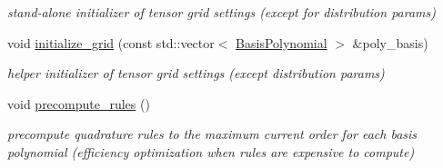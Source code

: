 \begin{DoxyCompactItemize}
\begin{DoxyCompactList}\small\item\em stand-\/alone initializer of tensor grid settings (except for distribution params) \end{DoxyCompactList}\item 
void \hyperlink{classPecos_1_1TensorProductDriver_a4a1a63a0f30824fcd233da026bdebef6}{initialize\+\_\+grid} (const std\+::vector$<$ \hyperlink{classPecos_1_1BasisPolynomial}{Basis\+Polynomial} $>$ \&poly\+\_\+basis)\label{classPecos_1_1TensorProductDriver_a4a1a63a0f30824fcd233da026bdebef6}

\begin{DoxyCompactList}\small\item\em helper initializer of tensor grid settings (except distribution params) \end{DoxyCompactList}\item 
void \hyperlink{classPecos_1_1TensorProductDriver_a58abd8ec1505f02f76197f788aa94127}{precompute\+\_\+rules} ()\label{classPecos_1_1TensorProductDriver_a58abd8ec1505f02f76197f788aa94127}

\begin{DoxyCompactList}\small\item\em precompute quadrature rules to the maximum current order for each basis polynomial (efficiency optimization when rules are expensive to compute) \end{DoxyCompactList}\end{DoxyCompactItemize}
